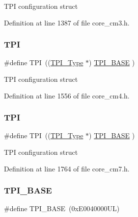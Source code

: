 T\+PI configuration struct 

Definition at line 1387 of file core\+\_\+cm3.\+h.

\mbox{\label{group___c_m_s_i_s__core__base_ga8b4dd00016aed25a0ea54e9a9acd1239}} 
\subsubsection{\texorpdfstring{T\+PI}{TPI}\hspace{0.1cm}{\footnotesize\ttfamily [3/4]}}
{\footnotesize\ttfamily \#define T\+PI~((\hyperlink{struct_t_p_i___type}{T\+P\+I\+\_\+\+Type}       $\ast$)     \hyperlink{group___c_m_s_i_s__core__base_ga2b1eeff850a7e418844ca847145a1a68}{T\+P\+I\+\_\+\+B\+A\+SE}      )}

T\+PI configuration struct 

Definition at line 1556 of file core\+\_\+cm4.\+h.

\mbox{\label{group___c_m_s_i_s__core__base_ga8b4dd00016aed25a0ea54e9a9acd1239}} 
\subsubsection{\texorpdfstring{T\+PI}{TPI}\hspace{0.1cm}{\footnotesize\ttfamily [4/4]}}
{\footnotesize\ttfamily \#define T\+PI~((\hyperlink{struct_t_p_i___type}{T\+P\+I\+\_\+\+Type}       $\ast$)     \hyperlink{group___c_m_s_i_s__core__base_ga2b1eeff850a7e418844ca847145a1a68}{T\+P\+I\+\_\+\+B\+A\+SE}      )}

T\+PI configuration struct 

Definition at line 1764 of file core\+\_\+cm7.\+h.

\mbox{\label{group___c_m_s_i_s__core__base_ga2b1eeff850a7e418844ca847145a1a68}} 
\subsubsection{\texorpdfstring{T\+P\+I\+\_\+\+B\+A\+SE}{TPI\_BASE}\hspace{0.1cm}{\footnotesize\ttfamily [1/4]}}
{\footnotesize\ttfamily \#define T\+P\+I\+\_\+\+B\+A\+SE~(0x\+E0040000\+U\+L)}

